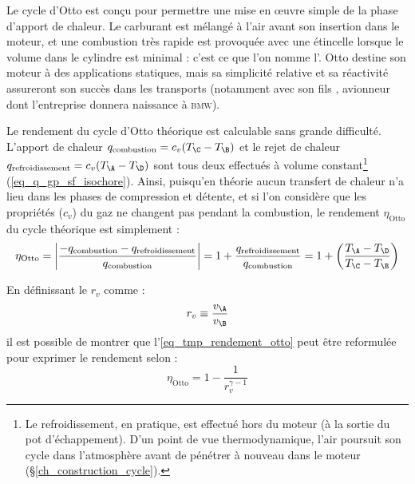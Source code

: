 		Le cycle d’Otto est conçu pour permettre une mise en œuvre simple de la phase d’apport de chaleur. Le carburant est mélangé à l’air avant son insertion dans le moteur, et une combustion très rapide est provoquée avec une étincelle lorsque le volume dans le cylindre est minimal : c’est ce que l’on nomme l’. Otto destine son moteur à des applications statiques, mais sa simplicité relative et sa réactivité assureront son succès dans les transports (notamment avec son fils , avionneur dont l’entreprise donnera naissance à \textsc{bmw}).

		Le rendement du cycle d’Otto théorique est calculable sans grande difficulté. L’apport de chaleur $q_\text{combustion} = c_v (T_\C - T_\B )$ et le rejet de chaleur $q_\text{refroidissement} = c_v (T_\A - T_\D)$ sont tous deux effectués à volume constant\footnote{Le refroidissement, en pratique, est effectué hors du moteur (à la sortie du pot d’échappement). D’un point de vue thermodynamique, l’air poursuit son cycle dans l’atmosphère avant de pénétrer à nouveau dans le moteur (\S\ref{ch_construction_cycle}).} (\ref{eq_q_gp_sf_isochore}). Ainsi, puisqu’en théorie aucun transfert de chaleur n’a lieu dans les phases de compression et détente, et si l’on considère que les propriétés ($c_v$) du gaz ne changent pas pendant la combustion, le rendement $\eta_\text{Otto}$ du cycle théorique est simplement :
		\begin{equation}
			\eta_\text{Otto} = \left| \frac{-q_\text{combustion} - q_\text{refroidissement}}{q_\text{combustion}} \right| = 1 + \frac{q_\text{refroidissement}}{q_\text{combustion}} = 1 + \left( \frac{T_\A - T_\D}{T_\C - T_\B } \right) \label{eq_tmp_rendement_otto}
		\end{equation}

		En définissant le  $r_v$ comme :
		\begin{equation}
			r_v \equiv  \frac{v_\A}{v_\B}
		\end{equation}
		il est possible de montrer que l’\cref{eq_tmp_rendement_otto} peut être reformulée pour exprimer le rendement selon :
		\begin{equation}
			\eta_\text{Otto} = 1 - \frac{1}{r_v^{\gamma -1}}
		\end{equation}

